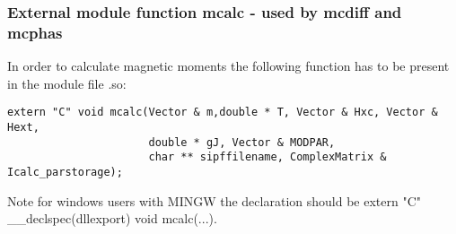 \subsubsection{External module function {\prg mcalc} - used by {\prg mcdiff}
and {\prg mcphas}  }

In order to calculate magnetic moments
 the following function has to be present in the module file {\prg *.so}:

\begin{verbatim}
extern "C" void mcalc(Vector & m,double * T, Vector & Hxc, Vector & Hext,
                      double * gJ, Vector & MODPAR,
                      char ** sipffilename, ComplexMatrix & Icalc_parstorage);
\end{verbatim}

Note for windows users with MINGW the declaration
 should be {\prg extern "C" \_\_declspec(dllexport) void mcalc(...)}.

